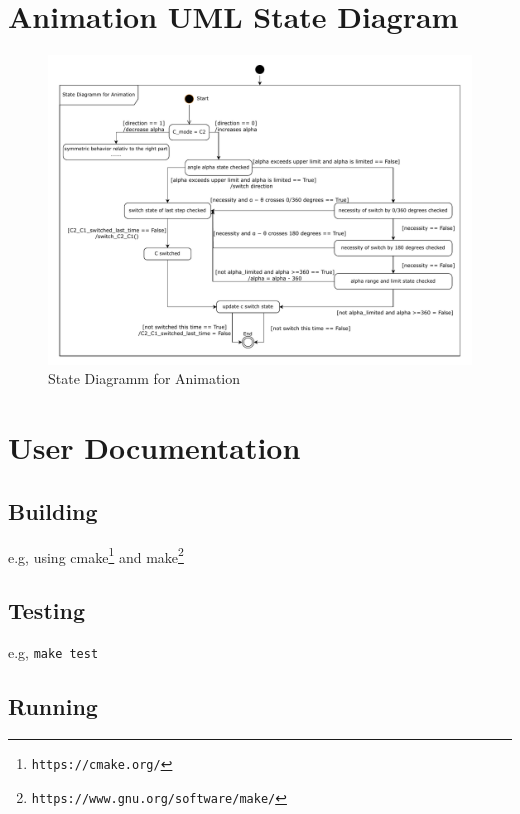 \documentclass{article}
\begin{document}



\appendix

\section{Animation UML State Diagram} \label{ap:animation}

\begin{figure}[h]
	\centering
	\includegraphics[width=\textwidth]{./figures/animation_state_diagramm_1.pdf}
	\caption{State Diagramm for Animation}
	\label{fig:state_diagramm_of_animation_alpha}
\end{figure}

\section{User Documentation} \label{ch:userdoc}

\subsection{Building}

e.g, using cmake\footnote{\tt https://cmake.org/} and make\footnote{\tt https://www.gnu.org/software/make/}


\subsection{Testing}

e.g, \verb!make test!

\subsection{Running}
\end{document}
